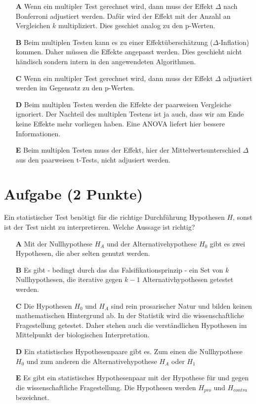 \documentclass[a4paper, 9pt]{scrartcl}\usepackage[]{graphicx}\usepackage[]{xcolor}
\begin{document}
\begin{enumerate}
\item [\textbf{A} \msquare] Wenn ein multipler Test gerechnet wird, dann muss der Effekt $\Delta$ nach Bonferroni adjustiert werden. Dafür wird der Effekt mit der Anzahl an Vergleichen $k$ multipliziert. Dies geschiet analog zu den p-Werten.
\item [\textbf{B} \msquare] Beim multiplen Testen kann es zu einer Effektüberschätzung ($\Delta$-Inflation) kommen. Daher müssen die Effekte angepasst werden. Dies geschieht nicht händisch sondern intern in den angewendeten Algorithmen.
\item [\textbf{C} \msquare] Wenn ein multipler Test gerechnet wird, dann muss der Effekt $\Delta$ adjustiert werden im Gegensatz zu den p-Werten.
\item [\textbf{D} \msquare] Beim multiplen Testen werden die Effekte der paarweisen Vergleiche ignoriert. Der Nachteil des multiplen Testens ist ja auch, dass wir am Ende keine Effekte mehr vorliegen haben. Eine ANOVA liefert hier bessere Informationen.
\item [\textbf{E} \msquare] Beim multiplen Testen muss der Effekt, hier der Mittelwertsunterschied $\Delta$ aus den paarweisen t-Tests, nicht adjusiert werden.
\end{enumerate} 

\section{Aufgabe \hfill (2 Punkte)}



Ein statistischer Test benötigt für die richtige Durchführung Hypothesen $H$, sonst ist der Test nicht zu interpretieren. Welche Aussage ist richtig?



\begin{enumerate}
\item [\textbf{A} \msquare] Mit der Nullhypothese $H_A$ und der Alternativehypothese $H_0$ gibt es zwei Hypothesen, die aber selten genutzt werden.
\item [\textbf{B} \msquare] Es gibt - bedingt durch das das Falsifikationsprinzip - ein Set von $k$ Nullhypothesen, die iterative gegen $k-1$ Alternativhypothesen getestet werden.
\item [\textbf{C} \msquare] Die Hypothesen $H_0$ und $H_A$ sind rein prosarischer Natur und bilden keinen mathematischen Hintergrund ab. In der Statistik wird die wissenschaftliche Fragestellung getestet. Daher stehen auch die verständlichen Hypothesen im Mittelpunkt der biologischen Interpretation.
\item [\textbf{D} \msquare] Ein statistisches Hypothesenpaare gibt es. Zum einen die Nullhypothese $H_0$ und zum anderen die Alternativehypothese $H_A$ oder $H_1$
\item [\textbf{E} \msquare] Es gibt ein statistisches Hypothesenpaar mit der Hypothese für und gegen die wissenschaftliche Fragestellung. Die Hypothesen werden $H_{pro}$ und $H_{contra}$ bezeichnet.
\end{enumerate} 
\end{document}
